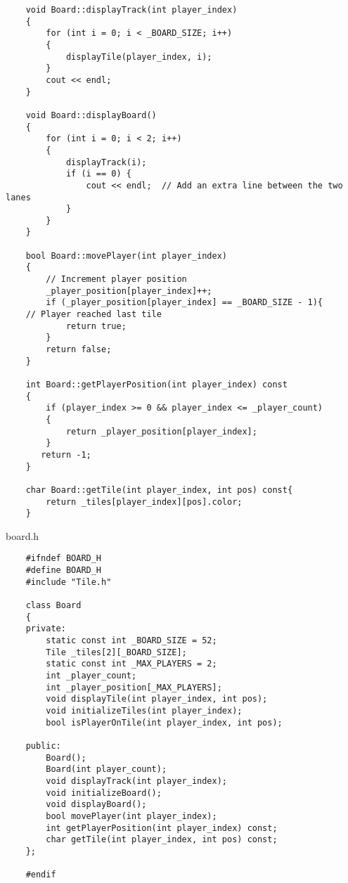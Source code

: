\documentclass{article}
\begin{document}
\begin{verbatim}
    void Board::displayTrack(int player_index)
    {
        for (int i = 0; i < _BOARD_SIZE; i++)
        {
            displayTile(player_index, i);
        }
        cout << endl;
    }
    
    void Board::displayBoard()
    {
        for (int i = 0; i < 2; i++)
        {
            displayTrack(i);
            if (i == 0) {
                cout << endl;  // Add an extra line between the two lanes
            }
        }
    }
    
    bool Board::movePlayer(int player_index)
    {
        // Increment player position
        _player_position[player_index]++;
        if (_player_position[player_index] == _BOARD_SIZE - 1){
    // Player reached last tile
            return true;
        }
        return false;
    }
    
    int Board::getPlayerPosition(int player_index) const
    {
        if (player_index >= 0 && player_index <= _player_count)
        {
            return _player_position[player_index];
        }
       return -1;
    }
    
    char Board::getTile(int player_index, int pos) const{
        return _tiles[player_index][pos].color;
    }
\end{verbatim}

\vspace{1cm}

board.h

\vspace{1cm}

\begin{verbatim}
    #ifndef BOARD_H
    #define BOARD_H
    #include "Tile.h"
    
    class Board
    {
    private:
        static const int _BOARD_SIZE = 52;
        Tile _tiles[2][_BOARD_SIZE];
        static const int _MAX_PLAYERS = 2;
        int _player_count;
        int _player_position[_MAX_PLAYERS];
        void displayTile(int player_index, int pos);
        void initializeTiles(int player_index);
        bool isPlayerOnTile(int player_index, int pos);
    
    public:
        Board();
        Board(int player_count);
        void displayTrack(int player_index);
        void initializeBoard();
        void displayBoard();
        bool movePlayer(int player_index);
        int getPlayerPosition(int player_index) const;
        char getTile(int player_index, int pos) const;
    };
    
    #endif
\end{verbatim}
\end{document}
